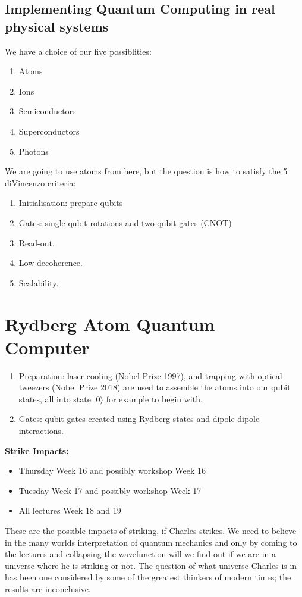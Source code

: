 \documentclass[lasers.tex]{subfiles}
\begin{document}
\section{Implementing Quantum Computing in real physical systems}
We have a choice of our five possiblities:
\begin{enumerate}
    \item Atoms
    \item Ions 
    \item Semiconductors
    \item Superconductors
    \item Photons
\end{enumerate}
We are going to use atoms from here, but the question is how to satisfy the 5 diVincenzo criteria:
\begin{enumerate}
    \item Initialisation: prepare qubits
    \item Gates: single-qubit rotations and two-qubit gates (CNOT)
    \item Read-out.
    \item Low decoherence.
    \item Scalability.
\end{enumerate}

\chapter{Rydberg Atom Quantum Computer}
\begin{enumerate}
    \item Preparation: laser cooling (Nobel Prize 1997), and trapping with optical tweezers (Nobel Prize 2018) are used to assemble the atoms into our qubit states, all into state $|0\rangle$ for example to begin with.
    \item Gates: qubit gates created using Rydberg states and dipole-dipole interactions.
\end{enumerate}

\textbf{Strike Impacts:}
\begin{itemize}
    \item Thursday Week 16 and possibly workshop Week 16
    \item Tuesday Week 17 and possibly workshop Week 17
    \item All lectures Week 18 and 19
\end{itemize}
These are the possible impacts of striking, if Charles strikes. 
We need to believe in the many worlds interpretation of quantum mechanics and only by coming to the lectures and collapsing the wavefunction will we find out if we are in a universe where he is striking or not.
The question of what universe Charles is in has been one considered by some of the greatest thinkers of modern times; the results are inconclusive. 
\end{document}
